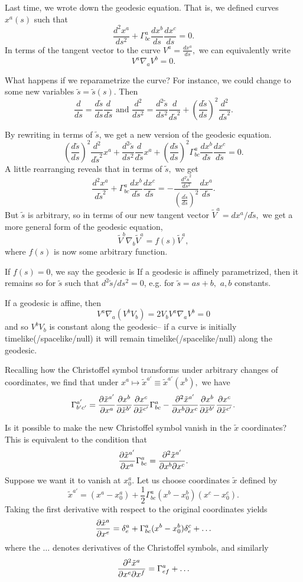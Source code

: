 Last time, we wrote down the geodesic equation. That is, we defined curves $x^a(s)$ such that
$$\frac{d^2x^a}{ds^2}+\Gamma^a_{bc}\frac{dx^b}{ds}\frac{dx^c}{ds}=0.$$
In terms of the tangent vector to the curve $V^a = \frac{dx^a}{ds},$
we can equivalently write
$$V^a\nabla_a V^b=0.$$

What happens if we reparametrize the curve? For instance, we could change to some new variables $\tilde s=\tilde s(s).$
Then $$\frac{d}{ds}=\frac{d\tilde s}{ds} \frac{d}{d\tilde s}\text{ and }\frac{d^2}{ds^2}=\frac{d^2 \tilde s}{ds^2}\frac{d}{d\tilde s^2} + \left(\frac{d\tilde s}{ds}\right)^2\frac{d^2}{d\tilde s^2}.$$

By rewriting in terms of $\tilde s$, we get a new version of the geodesic equation.
$$\left(\frac{d\tilde s}{ds}\right)^2 \frac{d^2}{d\tilde s^2} x^a+ \frac{d^2\tilde s}{ds^2} \frac{d}{d\tilde s} x^a + \left(\frac{d\tilde s}{ds}\right)^2 \Gamma^a_{bc} \frac{dx^b}{d\tilde s}\frac{dx^c}{d\tilde s}=0.$$
A little rearranging reveals that in terms of $\tilde s,$ we get
$$\frac{d^2x^a}{d\tilde s^2}+\Gamma^a_{bc} \frac{dx^b}{d\tilde s} \frac{dx^c}{d\tilde s}=-\frac{\frac{d^2\tilde s^2}{d s^2}}{\left(\frac{d\tilde s}{d s}\right)^2} \frac{dx^a}{d\tilde s}.$$
But $\tilde s$ is arbitrary, so in terms of our new tangent vector $\tilde V^a=dx^a/d\tilde s,$ we get a more general form of the geodesic equation,
$$\tilde V^b \nabla_b \tilde V^a=f(s)\tilde V^a,$$
where $f(s)$ is now some arbitrary function.
\begin{defn}
If $f(s)=0$, we say the geodesic is  If a geodesic is affinely parametrized, then it remains so for $\tilde s$ such that $d^2\tilde s/ds^2=0$, e.g. for $\tilde s= as+b,$ $a,b$ constants.
\end{defn}

If a geodesic is affine, then
$$V^a \nabla_a (V^b V_b)=2V_b V^a \nabla _a V^b=0$$ and so $V^b V_b$ is constant along the geodesic-- if a curve is initially timelike(/spacelike/null) it will remain timelike(/spacelike/null) along the geodesic.

Recalling how the Christoffel symbol transforms under arbitrary changes of coordinates, we find that under $x^a \mapsto \tilde x^{a'}\equiv \tilde x^{a'}(x^b),$ we have
$$\Gamma^{a'}_{b'c'}= \frac{\partial \tilde x^{a'}}{\partial x^a}\frac{\partial x^b}{\partial \tilde x^{b'}}\frac{\partial x^c}{\partial \tilde x^{c'}}\Gamma^a_{bc}-\frac{\partial^2 \tilde x^{a'}}{\partial  x^{b} \partial  x^{c}}\frac{\partial x^b}{\partial \tilde x^{b'}}\frac{\partial x^c}{\partial \tilde x^{c'}}.$$

Is it possible to make the new Christoffel symbol vanish in the $\tilde x$ coordinates? This is equivalent to the condition that
$$\frac{\partial \tilde x^{a'}}{\partial x^a} \Gamma^a_{bc}= \frac{\partial^2 \tilde x^{a'}}{\partial x^b \partial x^c}.$$ Suppose we want it to vanish at $x^a_0$. Let us choose coordinates $\tilde x$ defined by
$$\tilde x^{a'}=(x^a-x^a_0)+\frac{1}{2}\Gamma^a_{bc}(x^b-x_0^b)(x^c-x^c_0).$$
Taking the first derivative with respect to the original coordinates yields
$$\frac{\partial \tilde x^a}{\partial x^e}=\delta^a_e +\Gamma^a_{bc}(x^b-x^b_0)\delta^c_e+\ldots$$ where the $\ldots$ denotes derivatives of the Christoffel symbols, and similarly
$$\frac{\partial^2 \tilde x^a}{\partial x^e \partial x^f}=\Gamma^a_{ef}+\ldots$$

